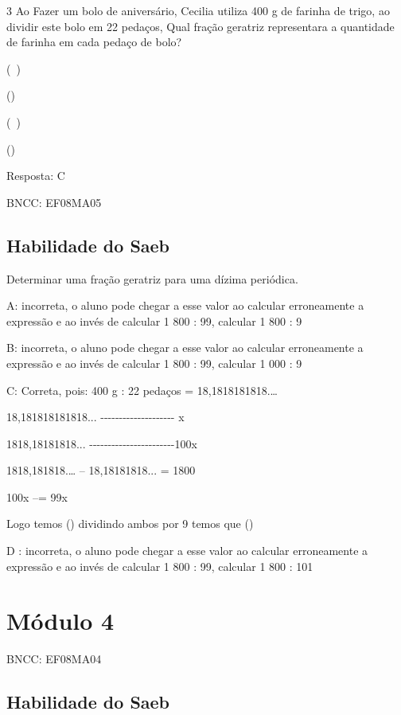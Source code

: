 \num{3} Ao Fazer um bolo de aniversário, Cecilia utiliza 400 g de farinha de
trigo, ao dividir este bolo em 22 pedaços, Qual fração geratriz
representara a quantidade de farinha em cada pedaço de bolo?

\item (\ )
\item ()
\item (\ )
\item ()

Resposta: C

BNCC: EF08MA05

\section{Habilidade do Saeb} Determinar uma fração geratriz para uma dízima
periódica.

A: incorreta, o aluno pode chegar a esse valor ao calcular erroneamente
a expressão e ao invés de calcular 1 800 : 99, calcular 1 800 : 9

B: incorreta, o aluno pode chegar a esse valor ao calcular erroneamente
a expressão e ao invés de calcular 1 800 : 99, calcular 1 000 : 9

C: Correta, pois: 400 g : 22 pedaços = 18,1818181818.\ldots{}

18,181818181818...
-\/-\/-\/-\/-\/-\/-\/-\/-\/-\/-\/-\/-\/-\/-\/-\/-\/-\/-\/- x

1818,18181818...
-\/-\/-\/-\/-\/-\/-\/-\/-\/-\/-\/-\/-\/-\/-\/-\/-\/-\/-\/-\/-\/-\/-100x

1818,181818.\ldots{} -- 18,18181818... = 1800

100x --\times = 99x

Logo temos () dividindo ambos por 9 temos que
()

D : incorreta, o aluno pode chegar a esse valor ao calcular erroneamente
a expressão e ao invés de calcular 1 800 : 99, calcular 1 800 : 101

\chapter{Módulo 4}

BNCC: EF08MA04

\section{Habilidade do Saeb}

